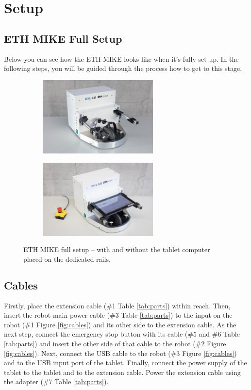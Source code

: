 \documentclass[10pt,oneside,a4paper]{article}
\begin{document}
\newpage
\section{Setup}

\subsection{ETH MIKE Full Setup}
Below you can see how the ETH MIKE looks like when it’s fully set-up. In the following steps, you will be guided through the process how to get to this stage.

\begin{figure}[h!]
\centering
\begin{subfigure}[b]{0.48\textwidth}
	\includegraphics[height=4cm]{images/Hardware/ETHMIKE.jpg}
\end{subfigure}
\hfill
\begin{subfigure}[b]{0.48\textwidth}
	\includegraphics[height=4cm]{images/Hardware/ETHMIKE2.png}
\end{subfigure}
\caption{ETH MIKE full setup – with and without the tablet computer placed on the dedicated rails.}
\label{fig:mike}
\end{figure}

\subsection{Cables}
Firstly, place the extension cable (\#1 Table \ref{tab:parts}) within reach. Then, insert the robot main power cable (\#3 Table \ref{tab:parts}) to the input on the robot (\#1 Figure \ref{fig:cables}) and its other side to the extension cable. As the next step, connect the emergency stop button with its cable (\#5 and \#6 Table \ref{tab:parts}) and insert the other side of that cable to the robot (\#2 Figure \ref{fig:cables}). Next, connect the USB cable to the robot (\#3 Figure \ref{fig:cables}) and to the USB input port of the tablet. Finally, connect the power supply of the tablet to the tablet and to the extension cable. Power the extension cable using the adapter (\#7 Table \ref{tab:parts}). 
\end{document}
